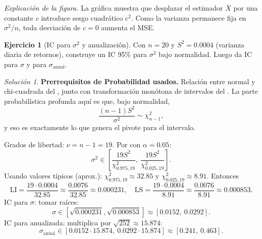 \documentclass[11pt]{article}
\theoremstyle{plain}
\theoremstyle{definition}
\newtheorem{exercise}[theorem]{Ejercicio}
\theoremstyle{remark}
\theoremstyle{solstyle}
\newtheorem*{solution}{Solución}
\newcommand{\1}{\mathbbm{1}}
\begin{document}
\begin{center}
\end{center}

\noindent\textit{Explicación de la figura.} La gráfica muestra que desplazar el estimador $\overline X$ por una constante $c$ introduce sesgo cuadrático $c^2$. Como la varianza permanece fija en $\sigma^2/n$, toda desviación de $c=0$ aumenta el MSE.

\begin{exercise}[IC para $\sigma^2$ y anualización]\label{ex:ex2}
Con $n=20$ y $S^2=0.0004$ (varianza diaria de retornos), construye un IC 95\% para $\sigma^2$ bajo normalidad.
Luego da IC para $\sigma$ y para $\sigma_{\text{anual}}$.
\end{exercise}

\begin{solution}
\textbf{Prerrequisitos de Probabilidad usados.}
Relación entre normal y chi-cuadrada del , junto con transformación monótona de intervalos del .
La parte probabilística profunda aquí es que, bajo normalidad,
\[
\frac{(n-1)S^2}{\sigma^2}\sim \chi^2_{n-1},
\]
y eso es exactamente lo que genera el pivote para el intervalo.

Grados de libertad: $\nu=n-1=19$.
Por  con $\alpha=0.05$:
\[
\sigma^2\in\left[\frac{19S^2}{\chi^2_{0.975,19}},\ \frac{19S^2}{\chi^2_{0.025,19}}\right].
\]
Usando valores típicos (aprox.): $\chi^2_{0.975,19}\approx 32.85$ y $\chi^2_{0.025,19}\approx 8.91$.
Entonces
\[
\text{LI}=\frac{19\cdot 0.0004}{32.85}\approx \frac{0.0076}{32.85}\approx 0.000231,
\quad
\text{LS}=\frac{19\cdot 0.0004}{8.91}\approx \frac{0.0076}{8.91}\approx 0.000853.
\]
IC para $\sigma$: tomar raíces:
\[
\sigma\in[\sqrt{0.000231},\sqrt{0.000853}]\approx [0.0152,\ 0.0292].
\]
IC para anualizada: multiplica por $\sqrt{252}\approx 15.874$:
\[
\sigma_{\text{anual}}\in[0.0152\cdot 15.874,\ 0.0292\cdot 15.874]\approx[0.241,\ 0.463].
\]
\end{solution}
\end{document}
